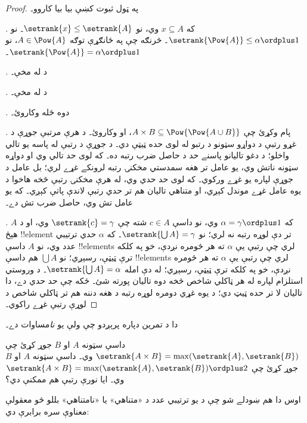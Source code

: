 \documentclass[../../../include/open-logic-section]{subfiles}
\begin{document}
\begin{proof}
په ټول ثبوت کښې  بيا بيا کاروو۔

\emph{.} که $x \subseteq A$ وي، نو $\setrank{x} \leq
\setrank{A}$۔ نو $\setrank{\Pow{A}} \leq \alpha \ordplus  1$۔
څرنګه چې په ځانګړې توګه $A \in \Pow{A}$، نو
$\setrank{\Pow{A}} = \alpha \ordplus  1$۔

\emph{.} د  له مخې۔

\emph{.} د  له مخې۔

\emph{.}  دوه ځله وکاروئ۔

\emph{.} پام وکړئ چې
$A \times B \subseteq \Pow{\Pow{A \cup B}}$، او 
وکاروئ۔ د هرې مرتبې جوړې د غړو رتبې د دواړو سټونو د رتبو
له لوی حده ټيټې دي۔ د جوړې د رتبې له پاسه يو تالي واخلو؛
د دغو تاليانو پاسنے حد د حاصل ضرب رتبه ده۔ که لوی حد تالي
وي او دواړه سټونه ناتش وي، يو عامل تر هغه سمدستي مخکنۍ
رتبه لرونکے غړے لري؛ بل عامل د جوړې لپاره يو غړے ورکوي۔
که لوی حد حدي وي، له هرې مخکنۍ رتبې څخه هاخوا د يوه عامل
غړے موندل کېږي، او متناهي تاليان هم تر حدي رتبې لاندې پاتې
کېږي۔ که يو عامل تش وي، حاصل ضرب تش دے۔

\emph{.} که $\alpha = \gamma\ordplus 1$ وي، نو
داسې $c \in A$ شته چې $\setrank{c} = \gamma$ وي، او د $A$
هېڅ !!{element} تر دې لوړه رتبه نه لري؛ نو
$\setrank{\bigcup A} = \gamma$۔ که $\alpha$ حدي ترتيبي عدد وي،
نو $A$ داسې !!{element}s لري چې رتبې يې $\alpha$ ته هر څومره نږدې،
خو په کلکه ترې ټيټې، رسېږي؛ نو $\bigcup A$ هم داسې !!{element}s
لري چې رتبې يې $\alpha$ ته هر څومره نږدې، خو په کلکه ترې ټيټې،
رسېږي؛ له دې امله $\setrank{\bigcup A} = \alpha$۔ د وروستي
استلزام لپاره له هر ټاکلي شاخص څخه دوه تاليان پورته شئ۔
ځکه چې حد حدي دے، دا تاليان لا تر حده ټيټ دي؛ د يوه
غړي دومره لوړه رتبه د هغه دننه هم تر ټاکلي شاخص د لوړې
رتبې غړے راکوي۔
\end{proof}
\noindent
دا د تمرين دپاره پرېږدو چې ولې  يو
\emph{نا}مساوات دے۔

\begin{prob}
داسې سټونه $A$ او $B$ جوړ کړئ چې $\setrank{A \times B}=
\max(\setrank{A}, \setrank{B})$ وي۔ داسې سټونه $A$ او $B$
جوړ کړئ چې
$\setrank{A \times B}=\max(\setrank{A}, \setrank{B}) \ordplus  2$
وي۔ ايا نورې رتبې هم ممکنې دي؟
\end{prob}

اوس دا هم ښودلے شو چې د يو ترتيبي عدد د «متناهي» يا «نامتناهي»
بللو څو معقولې معناوې سره برابرې دي:
\end{document}
